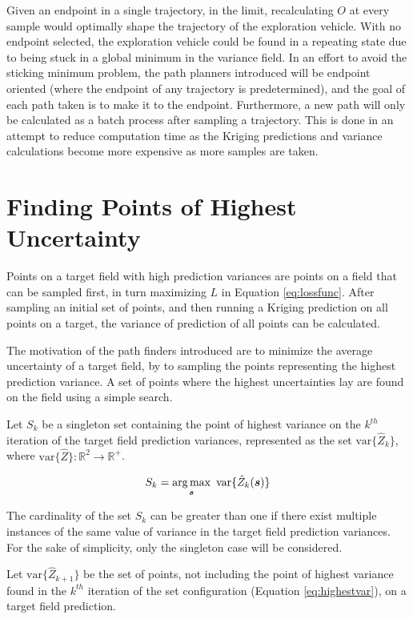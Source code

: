 Given an endpoint in a single trajectory, in the limit, recalculating $O$ at every sample would optimally shape the trajectory of the exploration vehicle. With no endpoint selected, the exploration vehicle could be found in a repeating state due to being stuck in a global minimum in the variance field. In an effort to avoid the sticking minimum problem, the path planners introduced will be endpoint oriented (where the endpoint of any trajectory is predetermined), and the goal of each path taken is to make it to the endpoint. Furthermore, a new path will only be calculated as a batch process after sampling a trajectory. This is done in an attempt to reduce computation time as the Kriging predictions and variance calculations become more expensive as more samples are taken.

\section{Finding Points of Highest Uncertainty} \label{sec:highestvars}
Points on a target field with high prediction variances are points on a field that can be sampled first, in turn maximizing $L$ in Equation \ref{eq:lossfunc}. After sampling an initial set of points, and then running a Kriging prediction on all points on a target, the variance of prediction of all points can be calculated.

The motivation of the path finders introduced are to minimize the average uncertainty of a target field, by to sampling the points representing the highest prediction variance. A set of points where the highest uncertainties lay are found on the field using a simple search.

Let $S_k$ be a singleton set containing the point of highest variance on the $k^{th}$ iteration of the target field prediction variances, represented as the set $\text{var}\{\hat{Z}_k\}$, where $\text{var}\{\hat{Z}\} : \mathbb{R}^2 \to \mathbb{R}^+$.

\begin{equation}
	S_{k} = \argmax_{\vect{s}} \ \text{var}\{\hat{Z}_{k}(\vect{s})\}
	\label{eq:highestvar}
\end{equation}

The cardinality of the set $S_k$ can be greater than one if there exist multiple instances of the same value of variance in the target field prediction variances. For the sake of simplicity, only the singleton case will be considered.

Let $\text{var}\{\hat{Z}_{k+1}\}$ be the set of points, not including the point of highest variance found in the $k^{th}$ iteration of the set configuration (Equation \ref{eq:highestvar}), on a target field prediction.


